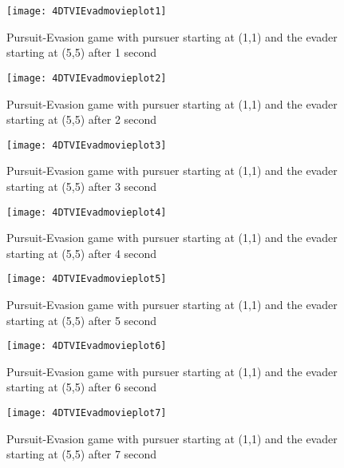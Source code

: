 \begin{figure}
\vspace{2.4in}
\centering
\texttt{[image: 4DTVIEvadmovieplot1]}
\caption{Pursuit-Evasion game with pursuer starting at (1,1) and the evader starting at (5,5) after 1 second}
\label{4DTVIEvadmovieplot1}
\end{figure}
\clearpage
\newpage

\begin{figure}
\vspace{2.4in}
\centering
\texttt{[image: 4DTVIEvadmovieplot2]}
\caption{Pursuit-Evasion game with pursuer starting at (1,1) and the evader starting at (5,5) after 2 second}
\label{4DTVIEvadmovieplot2}
\end{figure}
\clearpage
\newpage

\begin{figure}
\vspace{2.4in}
\centering
\texttt{[image: 4DTVIEvadmovieplot3]}
\caption{Pursuit-Evasion game with pursuer starting at (1,1) and the evader starting at (5,5) after 3 second}
\label{4DTVIEvadmovieplot3}
\end{figure}
\clearpage
\newpage

\begin{figure}
\vspace{2.4in}
\centering
\texttt{[image: 4DTVIEvadmovieplot4]}
\caption{Pursuit-Evasion game with pursuer starting at (1,1) and the evader starting at (5,5) after 4 second}
\label{4DTVIEvadmovieplot4}
\end{figure}
\clearpage
\newpage

\begin{figure}
\vspace{2.4in}
\centering
\texttt{[image: 4DTVIEvadmovieplot5]}
\caption{Pursuit-Evasion game with pursuer starting at (1,1) and the evader starting at (5,5) after 5 second}
\label{4DTVIEvadmovieplot5}
\end{figure}
\clearpage
\newpage

\begin{figure}
\vspace{2.4in}
\centering
\texttt{[image: 4DTVIEvadmovieplot6]}
\caption{Pursuit-Evasion game with pursuer starting at (1,1) and the evader starting at (5,5) after 6 second}
\label{4DTVIEvadmovieplot6}
\end{figure}
\clearpage
\newpage

\begin{figure}
\vspace{2.4in}
\centering
\texttt{[image: 4DTVIEvadmovieplot7]}
\caption{Pursuit-Evasion game with pursuer starting at (1,1) and the evader starting at (5,5) after 7 second}
\label{4DTVIEvadmovieplot7}
\end{figure}
\clearpage
\newpage


